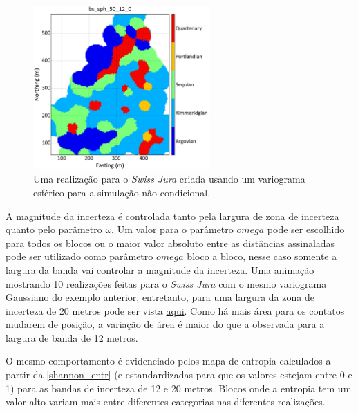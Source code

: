 \begin{figure}[H]
	\caption{\label{sph_jura} Uma realização para o \textit{Swiss Jura} criada usando um variograma esférico para a simulação não condicional.}
	\centering
		\includegraphics[width=0.6\textwidth]{capitulo_3/imagens/sph_real_0_50_12.png}
\end{figure}

A magnitude da incerteza é controlada tanto pela largura de zona de incerteza quanto pelo parâmetro $\omega$. Um valor para o parâmetro $omega$ pode ser escolhido para todos os blocos ou o maior valor absoluto entre as distâncias assinaladas pode ser utilizado como parâmetro $omega$ bloco a bloco, nesse caso somente a largura da banda vai controlar a magnitude da incerteza. Uma animação mostrando 10 realizações feitas para o \textit{Swiss Jura} com o mesmo variograma Gaussiano do exemplo anterior, entretanto, para uma largura da zona de incerteza de 20 metros pode ser vista \href{https://github.com/robertorolo/assessing_geological_model_uncertainty_with_probability_fields/blob/main/ezgif-2-721b458d5c70.gif}{aqui}. Como há mais área para os contatos mudarem de posição, a variação de área é maior do que a observada para a largura de banda de 12 metros. 

O mesmo comportamento é evidenciado pelos mapa de entropia calculados a partir da \autoref{shannon_entr} (e estandardizadas para que os valores estejam entre 0 e 1) para as bandas de incerteza de 12 e 20 metros. Blocos onde a entropia tem um valor alto variam mais entre diferentes categorias nas diferentes realizações. 

